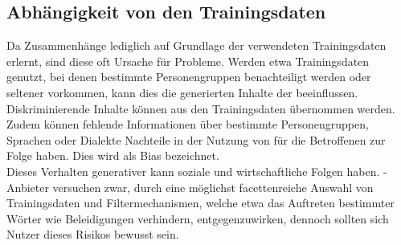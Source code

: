 \documentclass[../main.tex]{subfiles}
\begin{document}
\subsection{Abhängigkeit von den Trainingsdaten}

Da  Zusammenhänge lediglich auf Grundlage der verwendeten Trainingsdaten erlernt, sind diese oft Ursache für Probleme. Werden etwa Trainingsdaten genutzt, 
bei denen bestimmte Personengruppen benachteiligt werden oder seltener vorkommen, kann dies die generierten Inhalte der  beeinflussen. Diskriminierende Inhalte können aus den Trainingsdaten 
übernommen werden. Zudem können fehlende Informationen über bestimmte Personengruppen, Sprachen oder Dialekte Nachteile in der Nutzung von  für die Betroffenen zur Folge haben. Dies wird als Bias bezeichnet.\\ 
Dieses Verhalten generativer  kann soziale und wirtschaftliche Folgen haben. -Anbieter versuchen zwar, durch eine möglichst 
facettenreiche Auswahl von Trainingsdaten und Filtermechanismen, welche etwa das Auftreten bestimmter Wörter wie Beleidigungen verhindern, entgegenzuwirken, 
dennoch sollten sich Nutzer dieses Risikos bewusst sein.\\
\end{document}
